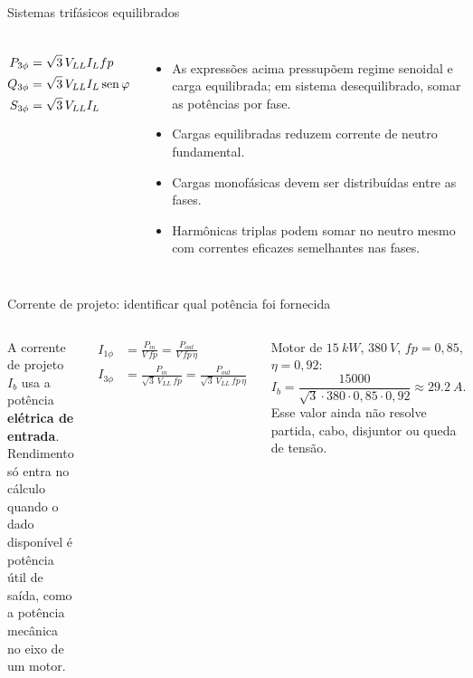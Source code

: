 \begin{frame}[shrink=5]{Sistemas trifásicos equilibrados}
\small
\begin{columns}[T,onlytextwidth]
\begin{align*}
P_{3\phi}&=\sqrt3\,V_{LL}I_L fp\\
Q_{3\phi}&=\sqrt3\,V_{LL}I_L\operatorname{sen}\varphi\\
S_{3\phi}&=\sqrt3\,V_{LL}I_L
\end{align*}
\begin{itemize}
\item As expressões acima pressupõem regime senoidal e carga equilibrada; em sistema desequilibrado, somar as potências por fase.
\item Cargas equilibradas reduzem corrente de neutro fundamental.
\item Cargas monofásicas devem ser distribuídas entre as fases.
\item Harmônicas triplas podem somar no neutro mesmo com correntes eficazes semelhantes nas fases.
\end{itemize}
\centering
{}
\end{columns}
\end{frame}

\begin{frame}{Corrente de projeto: identificar qual potência foi fornecida}
\small
\begin{columns}[T,onlytextwidth]
\begin{caixaDef}
A corrente de projeto $I_b$ usa a potência \textbf{elétrica de entrada}. Rendimento só entra no cálculo quando o dado disponível é potência útil de saída, como a potência mecânica no eixo de um motor.
\end{caixaDef}
\begin{align*}
I_{1\phi}&=\frac{P_{in}}{V\,fp}
=\frac{P_{out}}{V\,fp\,\eta}\\
I_{3\phi}&=\frac{P_{in}}{\sqrt3\,V_{LL}\,fp}
=\frac{P_{out}}{\sqrt3\,V_{LL}\,fp\,\eta}
\end{align*}
\begin{caixaEx}
Motor de $\SI{15}{kW}$, $\SI{380}{V}$, $fp=0{,}85$, $\eta=0{,}92$:
\[
I_b=\frac{15000}{\sqrt3\cdot380\cdot0{,}85\cdot0{,}92}\approx\SI{29.2}{A}.
\]
Esse valor ainda não resolve partida, cabo, disjuntor ou queda de tensão.
\end{caixaEx}
\end{columns}
\end{frame}


